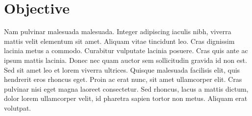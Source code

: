 \section{Objective}

Nam pulvinar malesuada malesuada. Integer adipiscing iaculis nibh, viverra mattis velit elementum sit amet. Aliquam vitae tincidunt leo. Cras dignissim lacinia metus a commodo. Curabitur vulputate lacinia posuere. Cras quis ante ac ipsum mattis lacinia. Donec nec quam auctor sem sollicitudin gravida id non est. Sed sit amet leo et lorem viverra ultrices. Quisque malesuada facilisis elit, quis hendrerit eros rhoncus eget. Proin ac erat nunc, sit amet ullamcorper elit. Cras pulvinar nisi eget magna laoreet consectetur. Sed rhoncus, lacus a mattis dictum, dolor lorem ullamcorper velit, id pharetra sapien tortor non metus. Aliquam erat volutpat.
